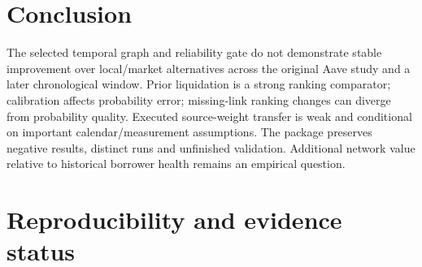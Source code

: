 \documentclass[
  10pt,
  a4paper,
]{article}
\begin{document}
\section{Conclusion}\label{conclusion}

The selected temporal graph and reliability gate do not demonstrate
stable improvement over local/market alternatives across the original
Aave study and a later chronological window. Prior liquidation is a
strong ranking comparator; calibration affects probability error;
missing-link ranking changes can diverge from probability quality.
Executed source-weight transfer is weak and conditional on important
calendar/measurement assumptions. The package preserves negative
results, distinct runs and unfinished validation. Additional network
value relative to historical borrower health remains an empirical
question.

\section{Reproducibility and evidence
status}\label{reproducibility-and-evidence-status}
\end{document}
